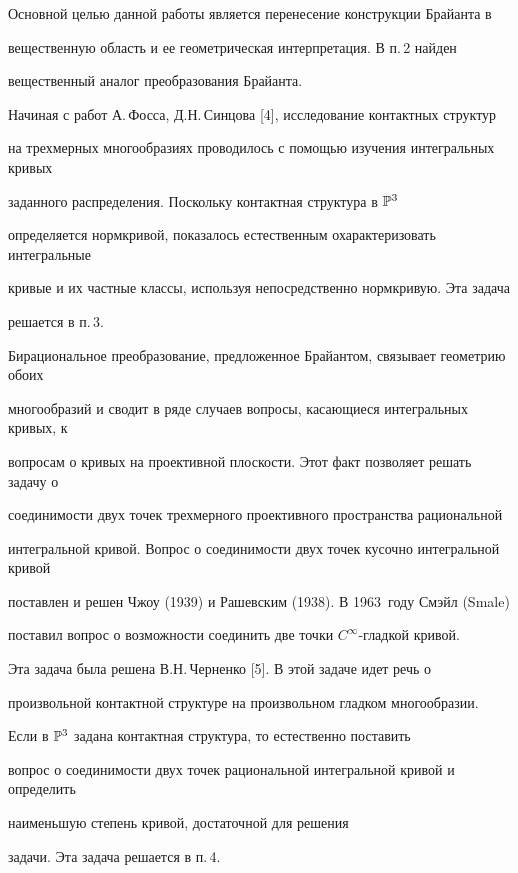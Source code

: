 Основной целью данной работы является перенесение конструкции Брайанта в 


вещественную область и ее геометрическая интерпретация. В п.\,2 найден 


вещественный аналог преобразования Брайанта.





Начиная с работ А.\,Фосса, Д.Н.\,Синцова [4], исследование контактных структур 


на трехмерных многообразиях проводилось с помощью изучения интегральных кривых 


заданного распределения. Поскольку контактная структура в $\Bbb{P}^3$ 


определяется нормкривой, показалось естественным охарактеризовать интегральные 


кривые и их частные классы, используя непосредственно нормкривую. Эта задача 


решается в п.\,3.





Бирациональное преобразование, предложенное Брайантом, связывает геометрию обоих 


многообразий и сводит в ряде случаев вопросы, касающиеся интегральных кривых, к 


вопросам о кривых на проективной плоскости. Этот факт позволяет решать задачу о 


соединимости двух точек трехмерного проективного пространства рациональной 


интегральной кривой. Вопрос о соединимости двух точек кусочно интегральной кривой 


поставлен и решен Чжоу (1939) и Рашевским (1938). В 1963~году Смэйл (Smale) 


поставил вопрос о возможности соединить две точки $C^{\infty}$-гладкой кривой. 


Эта задача была решена В.Н.\,Черненко [5]. В этой задаче идет речь о 


произвольной контактной структуре на произвольном гладком многообразии. 


Если в $\Bbb{P}^3$ задана контактная структура, то естественно поставить 


вопрос о соединимости двух точек рациональной интегральной кривой и определить 


наименьшую степень кривой, достаточной для решения 


задачи. Эта задача решается в п.\,4.


